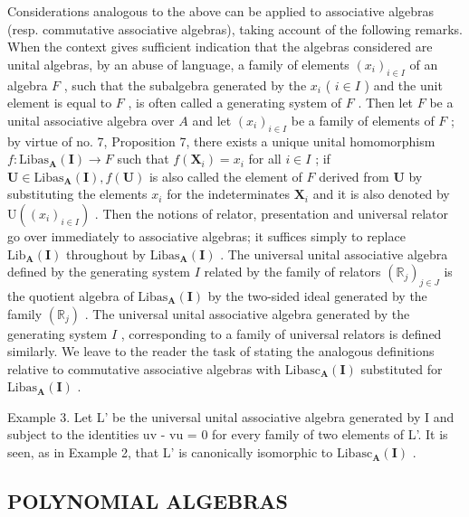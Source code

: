 Considerations analogous to the above can be applied to associative algebras (resp. commutative associative algebras), taking account of the following remarks. When the context gives sufficient indication that the algebras considered are unital algebras, by an abuse of language, a family of elements \((x_{i})_{i\in I}\) of an algebra \(F\) , such that the subalgebra generated by the \(x_{i}\) ( \(i\in I\) ) and the unit element is equal to \(F\) , is often called a generating system of \(F\) . Then let \(F\) be a unital associative algebra over \(A\) and let \((x_{i})_{i\in I}\) be a family of elements of \(F\) ; by virtue of no. 7, Proposition 7, there exists a unique unital homomorphism \(f:\mathrm{Libas}_{\mathbf{A}}(\mathbf{I})\to F\) such that \(f(\mathbf{X}_i) = x_i\) for all \(i\in I\) ; if \(\mathbf{U}\in \mathrm{Libas}_{\mathbf{A}}(\mathbf{I}), f(\mathbf{U})\) is also called the element of \(F\) derived from \(\mathbf{U}\) by substituting the elements \(x_{i}\) for the indeterminates \(\mathbf{X}_i\) and it is also denoted by \(\mathrm{U}((x_{i})_{i\in I})\) . Then the notions of relator, presentation and universal relator go over immediately to associative algebras; it suffices simply to replace \(\mathrm{Lib}_{\mathbf{A}}(\mathbf{I})\) throughout by \(\mathrm{Libas}_{\mathbf{A}}(\mathbf{I})\) . The universal unital associative algebra defined by the generating system \(I\) related by the family of relators \((\mathbb{R}_j)_{j\in J}\) is the quotient algebra of \(\mathrm{Libas}_{\mathbf{A}}(\mathbf{I})\) by the two-sided ideal generated by the family \((\mathbb{R}_j)\) . The universal unital associative algebra generated by the generating system \(I\) , corresponding to a family of universal relators is defined similarly. We leave to the reader the task of stating the analogous definitions relative to commutative associative algebras with \(\mathrm{Libasc}_{\mathbf{A}}(\mathbf{I})\) substituted for \(\mathrm{Libas}_{\mathbf{A}}(\mathbf{I})\) .

Example 3. Let L' be the universal unital associative algebra generated by I and subject to the identities uv - vu = 0 for every family of two elements of L'. It is seen, as in Example 2, that L' is canonically isomorphic to \(\text{Libasc}_{\mathbf{A}}(\mathbf{I})\) .

\subsection{POLYNOMIAL ALGEBRAS}

